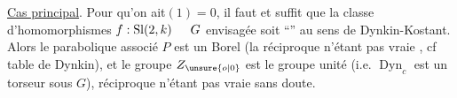 \uline{Cas principal}. Pour qu'on ait\hspace{1.5em}$(1)=0$, il faut et suffit que  la classe d'homomorphismes $f:\operatorname{Sl}(2,k)\hspace{1.5em}G$ envisagée soit ``'' au sens de Dynkin-Kostant. Alors le parabolique associé $P$ est un Borel (la réciproque n'étant pas vraie , cf table de Dynkin), et le groupe $Z_{\unsure{o|0}}$ est le groupe unité (i.e. $\operatorname{Dyn}_c$ est un torseur sous $G$),  réciproque n'étant pas vraie sans doute.
